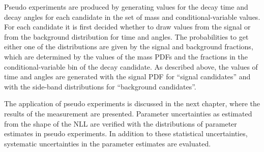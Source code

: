 Pseudo experiments are produced by generating values for the decay time and decay angles for each candidate in the set of mass and
conditional-variable values. For each candidate it is first decided whether to draw values from the signal or from the background
distribution for time and angles. The probabilities to get either one of the distributions are given by the signal and background
fractions, which are determined by the values of the mass PDFs and the fractions in the conditional-variable bin of the decay candidate.
As described above, the values of time and angles are generated with the signal PDF for ``signal candidates'' and with the side-band
distributions for ``background candidates''.

The application of pseudo experiments is discussed in the next chapter, where the results of the \BstoJpsiKK{} measurement are presented.
Parameter uncertainties as estimated from the shape of the NLL are verified with the distributions of parameter estimates in pseudo
experiments. In addition to these statistical uncertainties, systematic uncertainties in the parameter estimates are evaluated.
